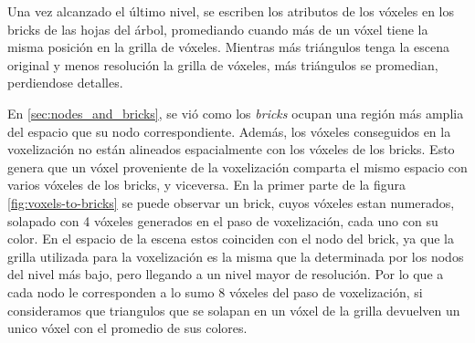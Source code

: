 Una vez alcanzado el último nivel, se escriben los atributos de los vóxeles en los bricks de las hojas del árbol, promediando cuando más de un vóxel tiene la misma posición en la grilla de vóxeles.
Mientras más triángulos tenga la escena original y menos resolución la grilla de vóxeles, más triángulos se promedian, perdiendose detalles.

En \ref{sec:nodes_and_bricks}, se vió como los \textit{bricks} ocupan una región más amplia del espacio que su nodo correspondiente.
Además, los vóxeles conseguidos en la voxelización no están alineados espacialmente con los vóxeles de los bricks.
Esto genera que un vóxel proveniente de la voxelización comparta el mismo espacio con varios vóxeles de los bricks, y viceversa.
En la primer parte de la figura \ref{fig:voxels-to-bricks} se puede observar un brick, cuyos vóxeles estan numerados, solapado con 4 vóxeles generados en el paso de voxelización, cada uno con su color.
En el espacio de la escena estos coinciden con el nodo del brick, ya que la grilla utilizada para la voxelización es la misma que la determinada por los nodos del nivel más bajo, pero llegando a un nivel mayor de resolución.
Por lo que a cada nodo le corresponden a lo sumo 8 vóxeles del paso de voxelización, si consideramos que triangulos que se solapan en un vóxel de la grilla devuelven un unico vóxel con el promedio de sus colores.

